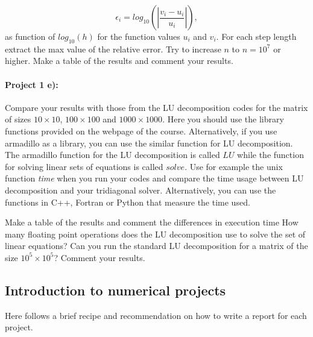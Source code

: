 \documentclass[%
oneside,                 %
final,                   %
10pt]{article}
\begin{document}
\[
   \epsilon_i=log_{10}\left(\left|\frac{v_i-u_i}
                 {u_i}\right|\right),
\]
as function of $log_{10}(h)$ for the function values $u_i$ and $v_i$.
For each step length extract the max value of the relative error.  
Try to increase $n$ to $n=10^7$ or higher.  Make a table of the results and 
comment your results. 

\paragraph{Project 1 e):}
Compare your results with those from the LU decomposition codes for the matrix of sizes $10\times 10$, $100\times 100$ and
$1000\times 1000$. Here you should use the library functions provided  on the webpage of the course. Alternatively, if you use armadillo as a library, you can use the similar function for LU decomposition.  The armadillo function for the LU decomposition is called $LU$ while the function for solving linear sets of equations is called $solve$.
Use for example the unix function \emph{time} when you run your codes 
and compare the time usage between LU decomposition and  your
tridiagonal solver.   Alternatively, you can use the functions in C++, Fortran or Python that measure the time used. 

Make a table of the results and comment the differences
in execution time
How many floating point operations does the LU decomposition use to solve the set of linear equations?
Can you run the standard LU decomposition
for a matrix of the size $10^5\times 10^5$?
Comment your results.







\subsection*{Introduction to numerical projects}

Here follows a brief recipe and recommendation on how to write a report for each
project.
\end{document}
